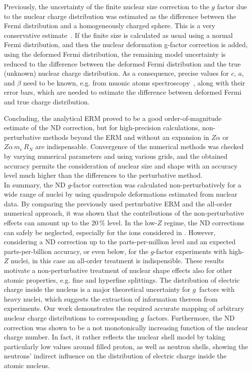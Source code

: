 Previously, the uncertainty of the finite nuclear size correction to the $g$ factor due to the nuclear charge distribution was estimated as the difference between the Fermi distribution and a homogeneously charged sphere. This is a very conservative estimate~\cite{Shabaev2006}. If the finite size is calculated as usual using a normal Fermi distribution, and then the nuclear deformation g-factor correction is added, using the deformed Fermi distribution, the remaining model uncertainty is reduced to the difference between the deformed Fermi distribution and the true (unknown) nuclear charge distribution. As a consequence, precise values for $c$, $a$, and $\beta$ need to be known, e.g. from muonic atoms spectroscopy~\cite{hitlin1970}, along with their error bars, which are needed to estimate the difference between deformed Fermi and true charge distribution.

Concluding, the analytical ERM proved to be a good order-of-magnitude estimate of the ND correction, but for high-precision calculations, non-perturbative methods beyond the ERM and without an expansion in $Z\alpha$ or $Z\alpha\, m_e\, R_N$ are indispensable. Convergence of the numerical methods was checked by varying numerical parameters and using various grids, and the obtained accuracy permits the consideration of nuclear size and shape with an accuracy level much higher than the differences to the perturbative method.\\

In summary, the ND $g$-factor correction was calculated non-perturbatively for a wide range of nuclei by using quadrupole deformations estimated from nuclear data.
By comparing the previously used perturbative ERM and the all-order numerical approach, it was shown that the contributions of the non-perturbative effects can amount up to the $20\,\%$ level.
In the low-$Z$ regime, the ND corrections can safely be neglected, especially for the ions considered in \cite{Sturm2014}. However, considering a ND correction up to the parts-per-million level and an expected parts-per-billion accuracy, or even below, for the $g$-factor experiments with high-$Z$ nuclei, in this case an all-order treatment is indispensible.
These results motivate a non-perturbative treatment of nuclear shape effects also for other atomic properties, e.g. fine and hyperfine splittings.
The distribution of electric charge inside the nucleus is a major theoretical uncertainty for $g$~factors with heavy nuclei, which suggests the extraction of information thereon from experiments. Our work demonstrates the required accurate mapping of arbitrary nuclear charge distributions to corresponding $g$~factors.
Furthermore, the ND correction was shown to be a not monotonically increasing function of the nuclear charge number. In fact, it rather reflects the nuclear shell model by taking particularly low values around filled proton, as well as neutron shells, showing the neutrons' indirect influence on the distribution of electric charge inside the atomic nucleus.\\









